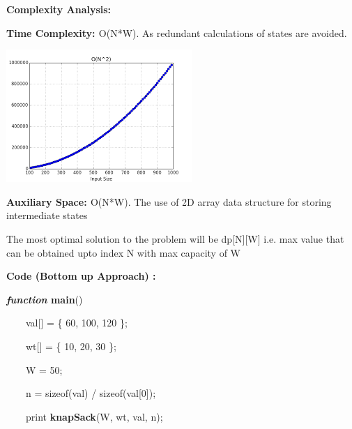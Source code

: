 \documentclass[letterpaper]{article}
\begin{document}
\begin{multicols}{2}
{\bfseries\color[rgb]{0.2509804,0.25882354,0.30588236}
Complexity Analysis: }

\textbf{\textcolor[rgb]{0.2509804,0.25882354,0.30588236}{Time Complexity:
}}\textcolor[rgb]{0.2509804,0.25882354,0.30588236}{O(N*W). \newline
As redundant calculations of states are avoided.}

\includegraphics[scale=1.0]{complexity}
\bigskip

\textbf{\textcolor[rgb]{0.2509804,0.25882354,0.30588236}{Auxiliary Space:
}}\textcolor[rgb]{0.2509804,0.25882354,0.30588236}{O(N*W). \newline
The use of 2D array data structure for storing intermediate states}

The most optimal solution to the problem will be dp[N][W] i.e. max value that can be obtained upto index N with max
capacity of W


\bigskip

\textbf{Code (Bottom up Approach) :} 


\bigskip

\textbf{\textit{\textcolor[rgb]{0.2509804,0.25882354,0.30588236}{function}}}\textbf{\textcolor[rgb]{0.2509804,0.25882354,0.30588236}{
main}}\textcolor[rgb]{0.2509804,0.25882354,0.30588236}{()}

{\color[rgb]{0.2509804,0.25882354,0.30588236}
\ \ \ \ val[] = \{ 60, 100, 120 \};}

{\color[rgb]{0.2509804,0.25882354,0.30588236}
\ \ \ \ wt[] = \{ 10, 20, 30 \};}

{\color[rgb]{0.2509804,0.25882354,0.30588236}
\ \ \ \ W = 50;}

{\color[rgb]{0.2509804,0.25882354,0.30588236}
\ \ \ \ n = sizeof(val) / sizeof(val[0]);}

\textcolor[rgb]{0.2509804,0.25882354,0.30588236}{\ \ \ \ print
}\textbf{\textcolor[rgb]{0.2509804,0.25882354,0.30588236}{knapSack}}\textcolor[rgb]{0.2509804,0.25882354,0.30588236}{(W,
wt, val, n);}


\bigskip


\end{multicols}
\end{document}
